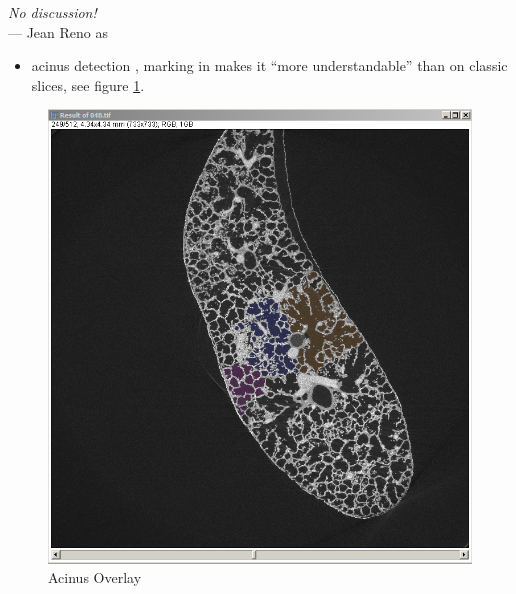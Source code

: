 \label{ch:discussion}
\begin{flushright}{\slshape No discussion!} \\ \medskip
    --- Jean Reno as \citep{Leon}
\end{flushright}
\bigskip
\begin{itemize}
	\item acinus detection \threed, marking in \twod makes it ``more understandable'' than on classic slices, see figure \ref{fig:acinus overlay}.
\end{itemize}

\renewcommand{\imsize}{0.618\linewidth}

\begin{figure}[h]
	\centering
	\includegraphics[width=\imsize]{img/Acinus_Overlay}
	\caption{Acinus Overlay}
	\label{fig:acinus overlay}
\end{figure}